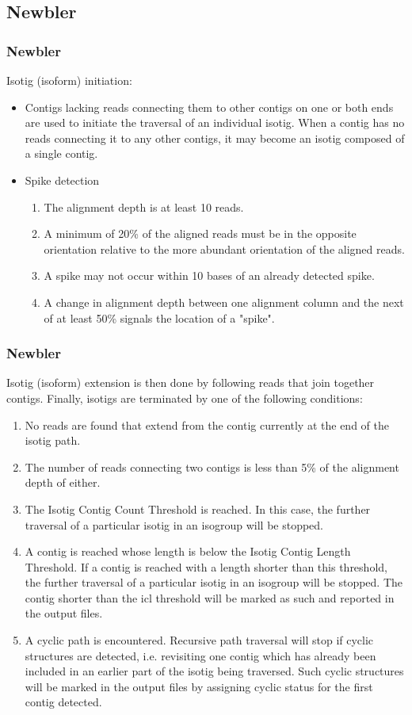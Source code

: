 \documentclass[pdf]{beamer}
\begin{document}
\subsection{Newbler}
\begin{frame}
  \frametitle{Newbler}
  Isotig (isoform) initiation:
  \begin{itemize}
    \item Contigs lacking reads connecting them to other contigs on one or both ends are used to initiate the traversal of an individual isotig. When a contig has no reads connecting it to any other contigs, it may become an isotig composed of a single contig.
    \item Spike detection
    \begin{enumerate}
    \item The alignment depth is at least 10 reads.
    \item A minimum of 20\% of the aligned reads must be in the opposite orientation relative to the more abundant orientation of the aligned reads.
    \item A spike may not occur within 10 bases of an already detected spike.
    \item A change in alignment depth between one alignment column and the next of at least 50\% signals the location of a "spike".
    \end{enumerate}
  \end{itemize}
\end{frame}

\begin{frame}[allowframebreaks]
  \frametitle{Newbler}
  Isotig (isoform) extension is then done by following reads that join together contigs. Finally, isotigs are terminated by one of the following conditions:
  \begin{enumerate}
  \item No reads are found that extend from the contig currently at the end of the isotig path.
  \item The number of reads connecting two contigs is less than 5\% of the alignment depth of either.
  \item The Isotig Contig Count Threshold is reached. In this case, the further traversal of a particular isotig in an isogroup will be stopped.
  \item A contig is reached whose length is below the Isotig Contig Length Threshold. If a contig is reached with a length shorter than this threshold, the further traversal of a particular isotig in an isogroup will be stopped. The contig shorter than the icl threshold will be marked as such and reported in the output files.
  \item A cyclic path is encountered. Recursive path traversal will stop if cyclic structures are detected, i.e. revisiting one contig which has already been included in an earlier part of the isotig being traversed. Such cyclic structures will be marked in the output files by assigning cyclic status for the first contig detected.
  \end{enumerate}
\end{frame}
\end{document}
